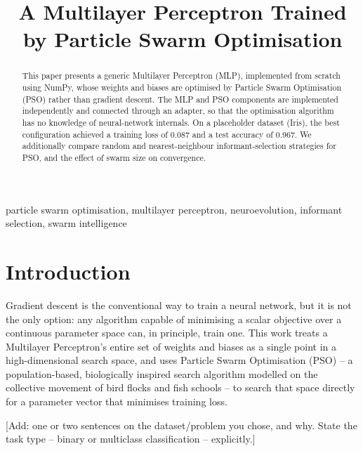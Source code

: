 \documentclass[conference]{IEEEtran}
\begin{document}
\title{A Multilayer Perceptron Trained by Particle Swarm Optimisation}

\author{
}

\maketitle

\begin{abstract}
This paper presents a generic Multilayer Perceptron (MLP), implemented from
scratch using NumPy, whose weights and biases are optimised by Particle
Swarm Optimisation (PSO) rather than gradient descent. The MLP and PSO
components are implemented independently and connected through an adapter,
so that the optimisation algorithm has no knowledge of neural-network
internals. On a placeholder dataset (Iris), the best configuration achieved
a training loss of 0.087 and a test accuracy of 0.967. We additionally
compare random and nearest-neighbour informant-selection strategies for PSO,
and the effect of swarm size on convergence.
\end{abstract}

\begin{IEEEkeywords}
particle swarm optimisation, multilayer perceptron, neuroevolution,
informant selection, swarm intelligence
\end{IEEEkeywords}

\section{Introduction}
Gradient descent is the conventional way to train a neural network, but it
is not the only option: any algorithm capable of minimising a scalar
objective over a continuous parameter space can, in principle, train one.
This work treats a Multilayer Perceptron's entire set of weights and biases
as a single point in a high-dimensional search space, and uses Particle
Swarm Optimisation (PSO) -- a population-based, biologically inspired
search algorithm modelled on the collective movement of bird flocks and
fish schools -- to search that space directly for a parameter vector that
minimises training loss.

[Add: one or two sentences on the dataset/problem you chose, and why. State
the task type -- binary or multiclass classification -- explicitly.]
\end{document}

